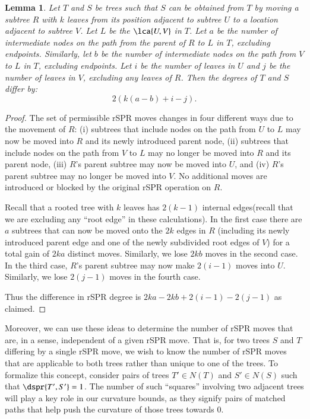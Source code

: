 \documentclass[]{elsarticle}
\newtheorem{lem}[thm]{Lemma}
\begin{document}
\begin{lem}
\label{lem:degree_change}
Let $T$ and $S$ be trees such that $S$ can be obtained from $T$ by moving a subtree $R$ with $k$ leaves from its position adjacent to subtree $U$ to a location adjacent to subtree $V$.
Let $L$ be the $\lca{U,V}$ in $T$.
Let $a$ be the number of intermediate nodes on the path from the parent of $R$ to $L$ in $T$, excluding endpoints.
Similarly, let $b$ be the number of intermediate nodes on the path from $V$ to $L$ in $T$, excluding endpoints.
Let $i$ be the number of leaves in $U$ and $j$ be the number of leaves in $V$, excluding any leaves of $R$.
Then the degrees of $T$ and $S$ differ by:
$$2\left(k(a-b) + i - j\right).$$

\end{lem}
\begin{proof}
The set of permissible rSPR moves changes in four different ways due to the movement of $R$:
(i) subtrees that include nodes on the path from $U$ to $L$ may now be moved into $R$ and its newly introduced parent node,
(ii) subtrees that include nodes on the path from $V$ to $L$ may no longer be moved into $R$ and its parent node,
(iii) $R$'s parent subtree may now be moved into $U$, and
(iv) $R$'s parent subtree may no longer be moved into $V$.
No additional moves are introduced or blocked by the original rSPR operation on $R$.

Recall that a rooted tree with $k$ leaves has $2(k-1)$ internal edges(recall that we are excluding any ``root edge'' in these calculations).
In the first case there are $a$ subtrees that can now be moved onto the $2k$ edges in $R$ (including its newly introduced parent edge and one of the newly subdivided root edges of $V$) for a total gain of $2ka$ distinct moves.
Similarly, we lose $2kb$ moves in the second case.
In the third case, $R$'s parent subtree may now make $2(i-1)$ moves into $U$.
Similarly, we lose $2(j-1)$ moves in the fourth case.

Thus the difference in rSPR degree is $2ka - 2kb + 2(i-1) - 2(j-1)$ as claimed.
\end{proof}


Moreover, we can use these ideas to determine the number of rSPR moves that are, in a sense, independent of a given rSPR move.
That is, for two trees $S$ and $T$ differing by a single rSPR move, we wish to know the number of rSPR moves that are applicable to both trees rather than unique to one of the trees.
To formalize this concept, consider pairs of trees $T' \in N(T)$ and $S' \in N(S)$ such that $\dspr{T',S'} = 1$.
The number of such ``squares'' involving two adjacent trees will play a key role in our curvature bounds, as they signify pairs of matched paths that help push the curvature of those trees towards 0.
\end{document}
